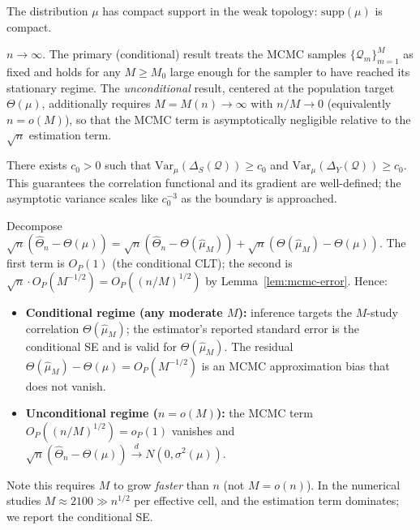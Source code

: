 \begin{assumption}
\label{assm:geometry}
The distribution $\mu$ has compact support in the weak topology: $\text{supp}(\mu)$ is compact.
\end{assumption}

\begin{assumption}
\label{assm:sample-size}
$n \to \infty$. The primary (conditional) result treats the MCMC samples $\{\mathcal{Q}_m\}_{m=1}^M$ as fixed and holds for any $M \geq M_0$ large enough for the sampler to have reached its stationary regime. The \emph{unconditional} result, centered at the population target $\Theta(\mu)$, additionally requires $M = M(n) \to \infty$ with $n/M \to 0$ (equivalently $n = o(M)$), so that the MCMC term is asymptotically negligible relative to the $\sqrt{n}$ estimation term.
\end{assumption}

\begin{assumption}
\label{assm:nondegeneracy}
There exists $c_0 > 0$ such that $\mathrm{Var}_\mu(\Delta_S(\mathcal{Q})) \geq c_0$ and $\mathrm{Var}_\mu(\Delta_Y(\mathcal{Q})) \geq c_0$. This guarantees the correlation functional and its gradient are well-defined; the asymptotic variance scales like $c_0^{-3}$ as the boundary is approached.
\end{assumption}

\begin{remark}
Decompose $\sqrt{n}(\hat{\Theta}_n - \Theta(\mu)) = \sqrt{n}(\hat{\Theta}_n - \Theta(\hat{\mu}_M)) + \sqrt{n}(\Theta(\hat{\mu}_M) - \Theta(\mu))$. The first term is $O_P(1)$ (the conditional CLT); the second is $\sqrt{n}\cdot O_P(M^{-1/2}) = O_P((n/M)^{1/2})$ by Lemma~\ref{lem:mcmc-error}. Hence:
\begin{itemize}
\item \textbf{Conditional regime (any moderate $M$):} inference targets the $M$-study correlation $\Theta(\hat{\mu}_M)$; the estimator's reported standard error is the conditional SE and is valid for $\Theta(\hat{\mu}_M)$. The residual $\Theta(\hat{\mu}_M) - \Theta(\mu) = O_P(M^{-1/2})$ is an MCMC approximation bias that does not vanish.
\item \textbf{Unconditional regime ($n = o(M)$):} the MCMC term $O_P((n/M)^{1/2}) = o_P(1)$ vanishes and $\sqrt{n}(\hat{\Theta}_n - \Theta(\mu)) \xrightarrow{d} N(0,\sigma^2(\mu))$.
\end{itemize}
Note this requires $M$ to grow \emph{faster} than $n$ (not $M = o(n)$). In the numerical studies $M \approx 2100 \gg n^{1/2}$ per effective cell, and the estimation term dominates; we report the conditional SE.
\end{remark}

